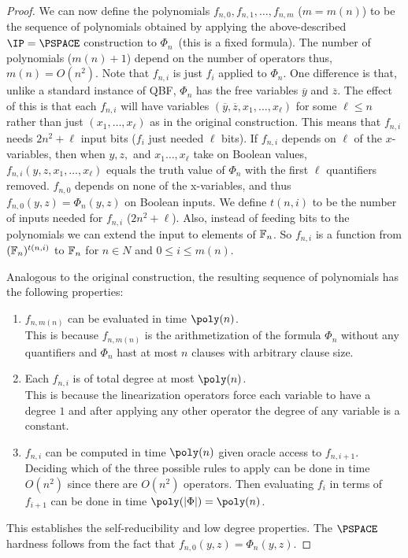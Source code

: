 \begin{proof}
We can now define the polynomials $f_{n,0}, f_{n,1},\ldots , f_{n,m}$ ($m = m(n)$) to be the sequence of polynomials obtained by applying the above-described $\IP = \PSPACE$ construction to $\Phi_n$~(this is a fixed formula). The number of polynomials ($m(n)+1$) depend on the number of operators thus, $m(n)=O(n^2)$. 
Note that $f_{n,i}$ is just $f_i$ applied to $\Phi_n$. 
One difference is that, unlike a standard instance of QBF, $\Phi_n$ has the free variables $\overline{y}$ and $\overline{z}$. The effect of this is that each $f_{n,i}$ will have variables $(\overline{y}, \overline{z}, x_1,\ldots, x_{\ell})$ for some $\ell \leq n$ rather than just $(x_1, \ldots , x_{\ell})$ as in the original construction. This means that $f_{n,i}$ needs $2n^2 + \ell$ input bits ($f_i$ just needed $\ell$ bits). 
If $f_{n,i}$ depends on $\ell$ of the $x$-variables, then when $y, z,$ and $x_1 \ldots , x_{\ell}$ take on Boolean values, $f_{n,i}(y, z, x_1, \ldots , x_{\ell})$ equals the truth value of $\Phi_n$ with the first $\ell$ quantifiers removed. $f_{n,0}$ depends on none of the x-variables, and thus $f_{n,0}(y, z) = \Phi_n(y, z)$ on Boolean inputs. We define $t(n,i)$ to be the number of inputs needed for $f_{n,i}$ ($2n^2+\ell$). Also, instead of feeding bits to the polynomials we can extend the input to elements of $\mathbb{F}_n$. So $f_{n,i}$ is a function from $(\mathbb{F}_n)^{t(n,i)}$ to $\mathbb{F}_n$ for $n \in N$ and $0 \leq i \leq m(n)$.

Analogous to the original construction, the resulting sequence of polynomials has the following properties:
\begin{enumerate}
	\item $f_{n,m(n)}$ can be evaluated in time $\poly(n)$. \\
	This is because $f_{n,m(n)}$ is the arithmetization of the formula $\Phi_n$ without any quantifiers and $\Phi_n$ hast at most $n$ clauses with arbitrary clause size. 
	
	\item Each $f_{n,i}$ is of total degree at most $\poly(n)$. \\
	This is because the linearization operators force each variable to have a degree $1$ and after applying any other operator the degree of any variable is a constant.
	
	\item $f_{n,i}$ can be computed in time $\poly(n)$ given oracle access to $f_{n,i+1}$. \\
	Deciding which of the three possible rules to apply can be done in time $O(n^2)$ since there are $O(n^2)$ operators. Then evaluating $f_i$ in terms of $f_{i+1}$ can be done in time $\poly(\card{\Phi}) = \poly(n)$.
\end{enumerate}

This establishes the self-reducibility and low degree properties. The $\PSPACE$ hardness follows from the fact that $f_{n,0}(y, z) = \Phi_n(y, z)$. 
\end{proof}

